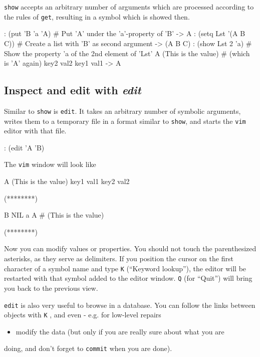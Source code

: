 \texttt{show} accepts an arbitrary number of arguments which are processed
according to the rules of \texttt{get}, resulting in a symbol which is showed
then.


\begin{wideverbatim}
: (put 'B 'a 'A)        # Put 'A' under the 'a'-property of 'B'
-> A
: (setq Lst '(A B C))   # Create a list with 'B' as second argument
-> (A B C)
: (show Lst 2 'a)       # Show the property 'a of the 2nd element of 'Lst'
A (This is the value)   # (which is 'A' again)
   key2 val2
   key1 val1
-> A
\end{wideverbatim}

 
\subsection{Inspect and edit with \emph{edit}}
\label{sec:tut-inspect-and-edit-with-edit}


Similar to \texttt{show} is \texttt{edit}. It takes an arbitrary number of symbolic
arguments, writes them to a temporary file in a format similar to
\texttt{show}, and starts the \texttt{vim} editor with that file.


\begin{wideverbatim}
: (edit 'A 'B)
\end{wideverbatim}

The \texttt{vim} window will look like


\begin{wideverbatim}
A (This is the value)
key1 val1
key2 val2

(********)

B NIL
a A  # (This is the value)

(********)
\end{wideverbatim}

Now you can modify values or properties. You should not touch the
parenthesized asterisks, as they serve as delimiters. If you position
the cursor on the first character of a symbol name and type  \texttt{K} 
(``Keyword lookup''), the editor will be restarted with that symbol added
to the editor window.  \texttt{Q}  (for ``Quit'') will bring you back to the
previous view.

\texttt{edit} is also very useful to browse in a database. You can follow the
links between objects with  \texttt{K} , and even - e.g. for low-level repairs
\begin{itemize}
\item modify the data (but only if you are really sure about what you are
\end{itemize}
doing, and don't forget to \texttt{commit} when you are done).

